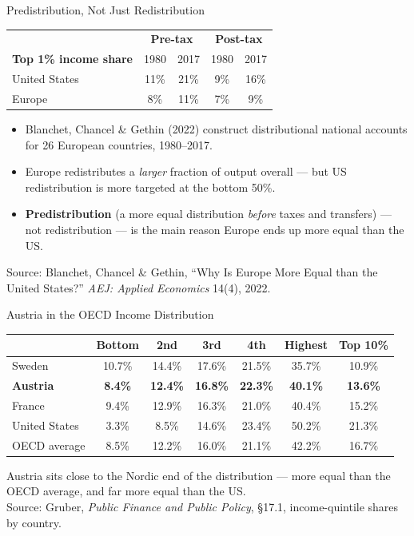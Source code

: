 \documentclass[11pt,aspectratio=169]{beamer}
\newcommand{\srcnote}[1]{{\footnotesize\color{wugray}Source: #1}}
\begin{document}
\begin{frame}{Predistribution, Not Just Redistribution}
  \footnotesize
  \begin{center}
  \begin{tabular}{@{}lcccc@{}}
    \toprule
     & \multicolumn{2}{c}{\textbf{Pre-tax}} & \multicolumn{2}{c}{\textbf{Post-tax}} \\
    \textbf{Top 1\% income share} & 1980 & 2017 & 1980 & 2017 \\
    \midrule
    United States & 11\% & 21\% & 9\% & 16\% \\
    Europe & 8\% & 11\% & 7\% & 9\% \\
    \bottomrule
  \end{tabular}
  \end{center}
  \vspace{0.3em}
  \begin{itemize}
    \item Blanchet, Chancel \& Gethin (2022) construct distributional national accounts for 26 European countries, 1980--2017.
    \item Europe redistributes a \emph{larger} fraction of output overall --- but US redistribution is more targeted at the bottom 50\%.
    \item \textbf{Predistribution} (a more equal distribution \emph{before} taxes and transfers) --- not redistribution --- is the main reason Europe ends up more equal than the US.
  \end{itemize}
  \srcnote{Blanchet, Chancel \& Gethin, ``Why Is Europe More Equal than the United States?'' \emph{AEJ: Applied Economics} 14(4), 2022.}
\end{frame}

\begin{frame}{Austria in the OECD Income Distribution}
  \footnotesize
  \begin{center}
  \begin{tabular}{@{}lcccccc@{}}
    \toprule
    & \textbf{Bottom} & \textbf{2nd} & \textbf{3rd} & \textbf{4th} & \textbf{Highest} & \textbf{Top 10\%} \\
    \midrule
    Sweden & 10.7\% & 14.4\% & 17.6\% & 21.5\% & 35.7\% & 10.9\% \\
    \textbf{Austria} & \textbf{8.4\%} & \textbf{12.4\%} & \textbf{16.8\%} & \textbf{22.3\%} & \textbf{40.1\%} & \textbf{13.6\%} \\
    France & 9.4\% & 12.9\% & 16.3\% & 21.0\% & 40.4\% & 15.2\% \\
    United States & 3.3\% & 8.5\% & 14.6\% & 23.4\% & 50.2\% & 21.3\% \\
    OECD average & 8.5\% & 12.2\% & 16.0\% & 21.1\% & 42.2\% & 16.7\% \\
    \bottomrule
  \end{tabular}
  \end{center}
  \vspace{0.3em}
  \centering
  Austria sits close to the Nordic end of the distribution --- more equal than the OECD average, and far more equal than the US.\\
  \srcnote{Gruber, \emph{Public Finance and Public Policy}, \S17.1, income-quintile shares by country.}
\end{frame}
\end{document}
